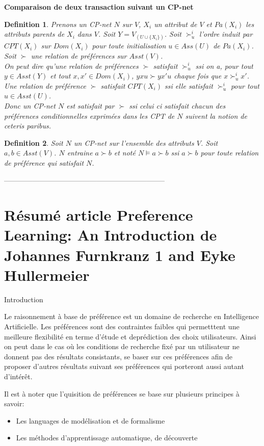 \documentclass[a4paper,12pt,openany,oneside]{article}
\newtheorem{defn}{Definition} %
\begin{document}
\textbf{Comparaison de deux transaction suivant un CP-net}
\begin{defn}
	Prenons un CP-net $N$ sur $V$, $X_i$ un attribut de $V$ et $Pa(X_i)$ les attributs parents de $X_i$ dans $V$. Soit $Y=V_(U\cup \{X_i\})$. Soit $\succ^i_u$ l'ordre induit par $CPT(X_i)$ sur $Dom(X_i)$ pour toute initialisation $u\in Ass(U)$ de $Pa(X_i)$. Soit $\succ$ une  relation de préférences sur $Asst(V)$.\\
	On peut dire qu'une relation de préférences $\succ$ satisfait $\succ^i_u$ ssi on a, pour tout $y\in Asst(Y)$ et tout $x,x'\in Dom(X_i)$, $yxu\succ yx'u$ chaque fois que $x\succ^i_u x'$.\\
	Une relation de préférence $\succ$ satisfait $CPT(X_i)$ ssi elle satisfait $\succ ^i_u$ pour tout $u\in Asst(U)$.\\
	Donc un CP-net $N$ est satisfait par $\succ$ ssi celui ci satisfait chacun des préférences conditionnelles exprimées dans les CPT de $N$ suivent la notion de ceteris paribus.
\end{defn}
\begin{defn}
	Soit $N$ un CP-net sur l'ensemble des attributs $V$. Soit $a,b\in Asst(V)$. $N$ entraine $a\succ b$ et noté $N\models a\succ b$ ssi $a\succ b$ pour toute relation de préférence qui satisfait $N$.\\
\end{defn}

--------------------------------------------------------------------\\


\section{Résumé article  Preference Learning: An Introduction de Johannes Furnkranz 1 and Eyke Hullermeier}

Introduction

Le raisonnement à base de préférence est un domaine de recherche en Intelligence Artificielle. Les préférences sont des contraintes faibles qui permetttent une meilleure flexibilité en terme d'étude et deprédiction des choix utilisateurs. Ainsi on peut dans le cas où les conditions de recherche fixé par un utilisateur ne donnent pas des résultats consistants, se baser sur ces préférences afin de proposer d'autres résultats suivant ses préférences qui porteront aussi autant d'intérêt.

Il est à noter que l'quisition de préférences se base sur plusieurs principes à savoir:
\begin{itemize}
	\item Les languages de modélisation et de formalisme
	\item Les méthodes d'apprentissage automatique, de découverte
\end{itemize}
\end{document}

